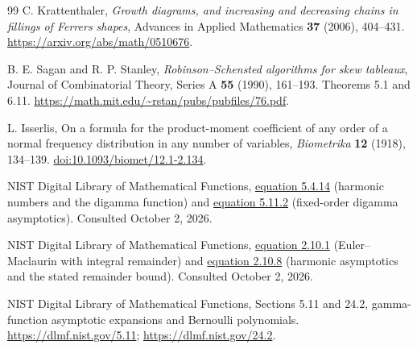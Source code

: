 \documentclass[11pt,letterpaper]{article}
\theoremstyle{remark}\newtheorem{remark}[theorem]{Remark}
\numberwithin{equation}{section}
\begin{document}
\begin{thebibliography}{99}
C. Krattenthaler, \emph{Growth diagrams, and increasing and decreasing chains in fillings of Ferrers shapes}, Advances in Applied Mathematics \textbf{37} (2006), 404--431. \url{https://arxiv.org/abs/math/0510676}.

B. E. Sagan and R. P. Stanley, \emph{Robinson--Schensted algorithms for skew tableaux}, Journal of Combinatorial Theory, Series A \textbf{55} (1990), 161--193. Theorems 5.1 and 6.11. \url{https://math.mit.edu/~rstan/pubs/pubfiles/76.pdf}.

L. Isserlis, On a formula for the product-moment coefficient of any order of a normal frequency distribution in any number of variables, \emph{Biometrika} \textbf{12} (1918), 134--139. \href{https://doi.org/10.1093/biomet/12.1-2.134}{doi:10.1093/biomet/12.1-2.134}.

NIST Digital Library of Mathematical Functions, \href{https://dlmf.nist.gov/5.4.E14}{equation 5.4.14} (harmonic numbers and the digamma function) and \href{https://dlmf.nist.gov/5.11.E2}{equation 5.11.2} (fixed-order digamma asymptotics). Consulted October 2, 2026.

NIST Digital Library of Mathematical Functions, \href{https://dlmf.nist.gov/2.10.E1}{equation 2.10.1} (Euler--Maclaurin with integral remainder) and \href{https://dlmf.nist.gov/2.10.E8}{equation 2.10.8} (harmonic asymptotics and the stated remainder bound). Consulted October 2, 2026.

NIST Digital Library of Mathematical Functions, Sections 5.11 and 24.2, gamma-function asymptotic expansions and Bernoulli polynomials. \url{https://dlmf.nist.gov/5.11}; \url{https://dlmf.nist.gov/24.2}.
\end{thebibliography}
\endgroup
\end{document}
